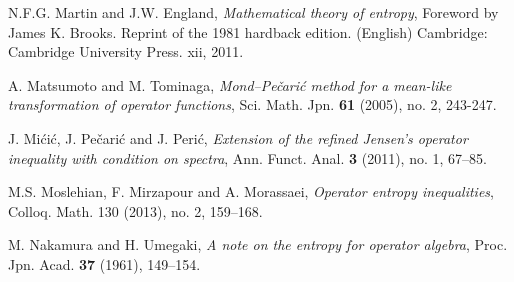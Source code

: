 \documentclass[12pt, reqno]{amsart}
\theoremstyle{definition}
\theoremstyle{remark}
\numberwithin{equation}{section}
\begin{document}
\begin{thebibliography}{99}
 N.F.G. Martin and J.W. England, \textit{Mathematical theory of entropy}, Foreword by James K. Brooks. Reprint of the 1981 hardback edition. (English) Cambridge: Cambridge University Press. xii, 2011.

 A. Matsumoto and M. Tominaga, \textit{Mond--Pe\v{c}ari\'{c} method for a mean-like transformation of operator functions}, Sci. Math. Jpn. \textbf{61} (2005), no. 2, 243-247.

 J. Mi\'ci\'c, J. Pe\v{c}ari\'{c} and J. Peri\'c, \textit{Extension of the refined Jensen's operator inequality with condition on spectra}, Ann. Funct. Anal. \textbf{3} (2011), no. 1, 67--85.

 M.S. Moslehian, F. Mirzapour  and A. Morassaei, \textit{Operator entropy inequalities}, Colloq. Math. 130 (2013), no. 2, 159--168.

 M. Nakamura and H. Umegaki, \textit{A note on the entropy for operator algebra}, Proc. Jpn. Acad. \textbf{37} (1961), 149--154.

\end{thebibliography}
\end{document}
